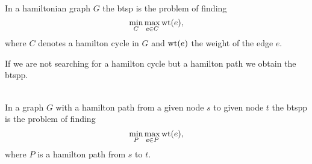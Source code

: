 \begin{definition}\label{def:btsp}\ \\
  In a hamiltonian graph \(G\) the \ac{btsp} is the problem of finding
  \begin{equation*}
    \min\limits_{C} \max\limits_{e \in C} \textrm{wt}(e),
  \end{equation*}
  where \(C\) denotes a hamilton cycle in \(G\) and \(\textrm{wt}(e)\) the weight of the edge \(e\).
\end{definition}

If we are not searching for a hamilton cycle but a hamilton path we obtain the \ac{btspp}.

\begin{definition}\label{def:btspp}\ \\
  In a graph \(G\) with a hamilton path from a given node \(s\) to given node \(t\) the \ac{btspp} is the problem of finding
  \begin{equation*}
    \min\limits_{P} \max\limits_{e \in P} \textrm{wt}(e),
  \end{equation*}
  where \(P\) is a hamilton path from \(s\) to \(t\).
\end{definition}

